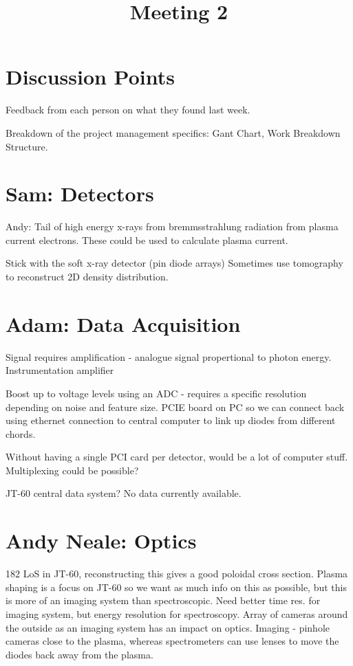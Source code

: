 \documentclass[11pt]{article}
\title{\textbf{Meeting 2}}
\date{}
\begin{document}
\section{Discussion Points}

Feedback from each person on what they found last week.

Breakdown of the project management specifics: Gant Chart, Work Breakdown Structure.

\section{Sam: Detectors}

Andy: Tail of high energy x-rays from bremmsstrahlung radiation from plasma current electrons. These could be used to calculate plasma current. 

Stick with the soft x-ray detector (pin diode arrays) Sometimes use tomography to reconstruct 2D density distribution. 

\section{Adam: Data Acquisition}

Signal requires amplification - analogue signal propertional to photon energy. 
 Instrumentation amplifier

Boost up to voltage levels using an ADC - requires a specific resolution depending on noise and feature size. PCIE board on PC so we can connect back using ethernet connection to central computer to link up diodes from different chords.

Without having a single PCI card per detector, would be a lot of computer stuff. Multiplexing could be possible?

JT-60 central data system? No data currently available. 

\section{Andy Neale: Optics}

182 LoS in JT-60, reconstructing this gives a good poloidal cross section. Plasma shaping is a focus on JT-60 so we want as much info on this as possible, but this is more of an imaging system than spectroscopic. Need better time res. for imaging system, but energy resolution for spectroscopy. Array of cameras around the outside as an imaging system has an impact on optics. Imaging - pinhole cameras close to the plasma, whereas spectrometers can use lenses to move the diodes back away from the plasma. 
\end{document}
